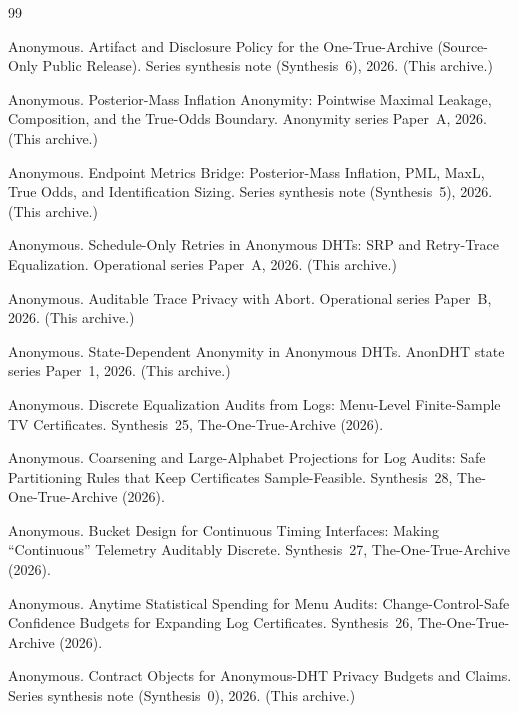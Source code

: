 \documentclass[11pt]{article}
\begin{document}
\begin{thebibliography}{99}\small

Anonymous.
\newblock Artifact and Disclosure Policy for the One-True-Archive (Source-Only Public Release).
\newblock Series synthesis note (Synthesis~6), 2026. (This archive.)

Anonymous.
\newblock Posterior-Mass Inflation Anonymity: Pointwise Maximal Leakage, Composition, and the True-Odds Boundary.
\newblock Anonymity series Paper~A, 2026. (This archive.)

Anonymous.
\newblock Endpoint Metrics Bridge: Posterior-Mass Inflation, PML, MaxL, True Odds, and Identification Sizing.
\newblock Series synthesis note (Synthesis~5), 2026. (This archive.)


Anonymous.
\newblock Schedule-Only Retries in Anonymous DHTs: SRP and Retry-Trace Equalization.
\newblock Operational series Paper~A, 2026. (This archive.)

Anonymous.
\newblock Auditable Trace Privacy with Abort.
\newblock Operational series Paper~B, 2026. (This archive.)

Anonymous.
\newblock State-Dependent Anonymity in Anonymous DHTs.
\newblock AnonDHT state series Paper~1, 2026. (This archive.)

Anonymous.
\newblock Discrete Equalization Audits from Logs: Menu-Level Finite-Sample TV Certificates.
\newblock Synthesis~25, The-One-True-Archive (2026).

Anonymous.
\newblock Coarsening and Large-Alphabet Projections for Log Audits: Safe Partitioning Rules that Keep Certificates Sample-Feasible.
\newblock Synthesis~28, The-One-True-Archive (2026).

Anonymous.
\newblock Bucket Design for Continuous Timing Interfaces: Making ``Continuous'' Telemetry Auditably Discrete.
\newblock Synthesis~27, The-One-True-Archive (2026).

Anonymous.
\newblock Anytime Statistical Spending for Menu Audits: Change-Control-Safe Confidence Budgets for Expanding Log Certificates.
\newblock Synthesis~26, The-One-True-Archive (2026).

Anonymous.
\newblock Contract Objects for Anonymous-DHT Privacy Budgets and Claims.
\newblock Series synthesis note (Synthesis~0), 2026. (This archive.)


\end{thebibliography}
\end{document}
